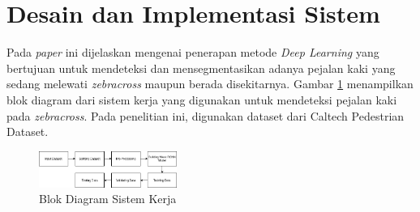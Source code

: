 \documentclass[conference]{IEEEtran}
\begin{document}
	\section{Desain dan Implementasi Sistem}
	\vspace{1ex}
	Pada \textit{paper} ini dijelaskan mengenai penerapan metode \textit{Deep Learning} yang bertujuan untuk mendeteksi dan mensegmentasikan adanya pejalan kaki yang sedang melewati \textit{zebracross} maupun berada disekitarnya. Gambar \ref{fig:1} menampilkan blok diagram dari sistem kerja yang digunakan untuk mendeteksi pejalan kaki pada \textit{zebracross}. Pada penelitian ini, digunakan dataset dari Caltech Pedestrian Dataset.
	\vspace{1ex}
	\begin{figure}[!ht] \centering
		\includegraphics[width=0.4\textwidth]{img/blok-diagram.png}
		\caption{Blok Diagram Sistem Kerja}
		\label{fig:1}
	\end{figure}
\end{document}
